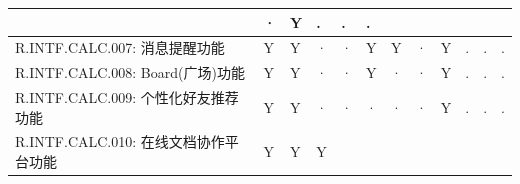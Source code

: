 \begin{table}[htbp]
\begin{tabular}{|p{9em}|p{2em}|p{2em}|p{2em}|p{2em}|p{2em}|
                            p{2em}|p{2em}|p{2em}|p{2em}|p{2em}|p{2em}|}
                & ·                     & Y                 & .
                & .                     & . \\
            \hline %
            R.INTF.CALC.007: 消息提醒功能
                & Y                     & Y                 & · 
                & ·                     & Y                 & Y 
                & ·                     & Y                 & .
                & .                     & . \\
            \hline %
            R.INTF.CALC.008: Board(广场)功能
                & Y                     & Y                 & · 
                & ·                     & Y                 & · 
                & ·                     & Y                 & .
                & .                     & . \\
            \hline %
            R.INTF.CALC.009: 个性化好友推荐功能
                & Y                     & Y                 & · 
                & ·                     & ·                 & · 
                & ·                     & Y                 & .
                & .                     & . \\
            \hline %
            R.INTF.CALC.010: 在线文档协作平台功能
                & Y                     & Y                 & Y 

\end{tabular}
\end{table}
